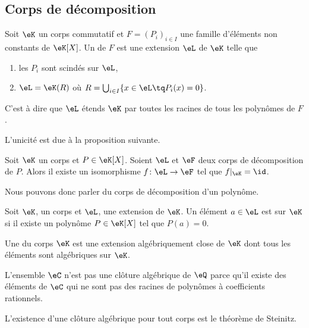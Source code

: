 \subsection{Corps de décomposition}

\begin{definition}
    Soit \( \eK\) un corps commutatif et \( F=(P_i)_{i\in I}\) une famille d'éléments non constants de \( \eK[X]\). Un  de \( F\) est une extension \( \eL\) de \( \eK\) telle que
    \begin{enumerate}
        \item
            les \( P_i\) sont scindés sur \( \eL\),
        \item
            \( \eL=\eK(R)\) où \( R=\bigcup_{i\in I}\{ x\in\eL\tq P_i(x)=0 \}\).
    \end{enumerate}
    C'est à dire que \( \eL\) étends \( \eK\) par toutes les racines de tous les polynômes de \( F\).
\end{definition}

L'unicité est due à la proposition suivante.
\begin{proposition}     \label{PropTMkfyM}
    Soit \( \eK\) un corps et \( P\in\eK[X]\). Soient \( \eL\) et \( \eF\) deux corps de décomposition de \( P\). Alors il existe un isomorphisme \( f\colon \eL\to \eF\) tel que \( f|_{\eK}=\id\).
\end{proposition}
Nous pouvons donc parler du corps de décomposition d'un polynôme.

Soit \( \eK\), un corps et \( \eL\), une extension de \( \eK\). Un élément \( a\in \eL\) est  sur \( \eK\) si il existe un polynôme \( P\in \eK[X]\) tel que \( P(a)=0\).

Une  du corps \( \eK\) est une extension algébriquement close de \( \eK\) dont tous les éléments sont algébriques sur \( \eK\).

\begin{remark}
    L'ensemble \( \eC\) n'est pas une clôture algébrique de \( \eQ\) parce qu'il existe des éléments de \( \eC\) qui ne sont pas des racines de polynômes à coefficients rationnels.
\end{remark}
L'existence d'une clôture algébrique pour tout corps est le théorème de Steinitz.

